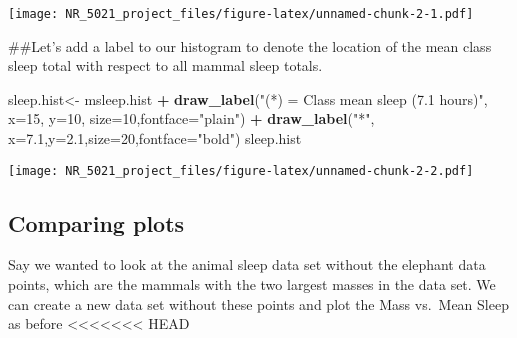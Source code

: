 \documentclass[]{article}
\newenvironment{Shaded}{\begin{snugshade}}{\end{snugshade}}
\newcommand{\KeywordTok}[1]{\textcolor[rgb]{0.13,0.29,0.53}{\textbf{#1}}}
\newcommand{\DataTypeTok}[1]{\textcolor[rgb]{0.13,0.29,0.53}{#1}}
\newcommand{\DecValTok}[1]{\textcolor[rgb]{0.00,0.00,0.81}{#1}}
\newcommand{\FloatTok}[1]{\textcolor[rgb]{0.00,0.00,0.81}{#1}}
\newcommand{\StringTok}[1]{\textcolor[rgb]{0.31,0.60,0.02}{#1}}
\newcommand{\CommentTok}[1]{\textcolor[rgb]{0.56,0.35,0.01}{\textit{#1}}}
\newcommand{\OperatorTok}[1]{\textcolor[rgb]{0.81,0.36,0.00}{\textbf{#1}}}
\newcommand{\NormalTok}[1]{#1}
\begin{document}
\texttt{[image: NR\_5021\_project\_files/figure-latex/unnamed-chunk-2-1.pdf]}

\begin{Shaded}
\begin{Highlighting}[]
\NormalTok{##Let's add a label to our histogram to denote the location of the mean class sleep total with respect to all mammal sleep totals.}

\NormalTok{sleep.hist<-}\StringTok{ }\NormalTok{msleep.hist }\OperatorTok{+}\StringTok{ }\KeywordTok{draw_label}\NormalTok{(}\StringTok{"(*) = Class mean sleep (7.1 hours)"}\NormalTok{, }\DataTypeTok{x=}\DecValTok{15}\NormalTok{, }\DataTypeTok{y=}\DecValTok{10}\NormalTok{, }\DataTypeTok{size=}\DecValTok{10}\NormalTok{,}\DataTypeTok{fontface=}\StringTok{"plain"}\NormalTok{) }\OperatorTok{+}\StringTok{ }\KeywordTok{draw_label}\NormalTok{(}\StringTok{"*"}\NormalTok{, }\DataTypeTok{x=}\FloatTok{7.1}\NormalTok{,}\DataTypeTok{y=}\FloatTok{2.1}\NormalTok{,}\DataTypeTok{size=}\DecValTok{20}\NormalTok{,}\DataTypeTok{fontface=}\StringTok{"bold"}\NormalTok{)}
\NormalTok{sleep.hist}
\end{Highlighting}
\end{Shaded}

\texttt{[image: NR\_5021\_project\_files/figure-latex/unnamed-chunk-2-2.pdf]}

\subsection{Comparing plots}\label{comparing-plots}

Say we wanted to look at the animal sleep data set without the elephant
data points, which are the mammals with the two largest masses in the
data set. We can create a new data set without these points and plot the
Mass vs.~Mean Sleep as before
\textless{}\textless{}\textless{}\textless{}\textless{}\textless{}\textless{}
HEAD

\begin{Shaded}
\end{Shaded}
\end{document}
